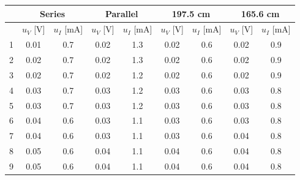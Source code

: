 \documentclass{article}
\begin{document}
{\begin{table}[H]\centering
    \begin{tabular}{ccc||cc||cc||cc}
        \toprule
           & \multicolumn{2}{c||}{Series} & \multicolumn{2}{c||}{Parallel} & \multicolumn{2}{c||}{197.5 cm} & \multicolumn{2}{c}{165.6 cm}                                                   \\
        \midrule
           & $u_V$ [V]                    & $u_I$ [mA]                     & $u_V$ [V]                      & $u_I$ [mA]                   & $u_V$ [V] & $u_I$ [mA] & $u_V$ [V] & $u_I$ [mA] \\
        \midrule
        1  & 0.01                         & 0.7                            & 0.02                           & 1.3                          & 0.02      & 0.6        & 0.02      & 0.9        \\
        2  & 0.02                         & 0.7                            & 0.02                           & 1.3                          & 0.02      & 0.6        & 0.02      & 0.9        \\
        3  & 0.02                         & 0.7                            & 0.02                           & 1.2                          & 0.02      & 0.6        & 0.02      & 0.9        \\
        4  & 0.03                         & 0.7                            & 0.03                           & 1.2                          & 0.03      & 0.6        & 0.03      & 0.8        \\
        5  & 0.03                         & 0.7                            & 0.03                           & 1.2                          & 0.03      & 0.6        & 0.03      & 0.8        \\
        6  & 0.04                         & 0.6                            & 0.03                           & 1.1                          & 0.03      & 0.6        & 0.03      & 0.8        \\
        7  & 0.04                         & 0.6                            & 0.03                           & 1.1                          & 0.03      & 0.6        & 0.04      & 0.8        \\
        8  & 0.05                         & 0.6                            & 0.04                           & 1.1                          & 0.04      & 0.6        & 0.04      & 0.8        \\
        9  & 0.05                         & 0.6                            & 0.04                           & 1.1                          & 0.04      & 0.6        & 0.04      & 0.8        \\

\end{tabular}
\end{table}}
\end{document}
